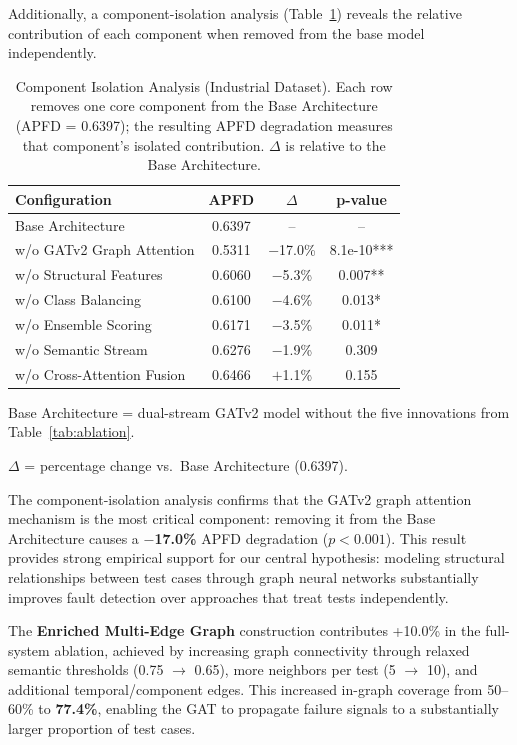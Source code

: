 Additionally, a component-isolation analysis (Table~\ref{tab:ablation_isolation})
reveals the relative contribution of each component when removed from the
base model independently.

\begin{table}[!t]
\centering
\caption{Component Isolation Analysis (Industrial Dataset). Each row removes one core component from the Base Architecture (APFD = 0.6397); the resulting APFD degradation measures that component's isolated contribution. $\Delta$ is relative to the Base Architecture.}
\label{tab:ablation_isolation}
\footnotesize
\begin{tabular}{lccc}
\toprule
\textbf{Configuration} & \textbf{APFD} & \textbf{$\Delta$} & \textbf{p-value} \\
\midrule
Base Architecture & 0.6397 & -- & -- \\
w/o GATv2 Graph Attention & 0.5311 & $-$17.0\% & 8.1e-10*** \\
w/o Structural Features & 0.6060 & $-$5.3\% & 0.007** \\
w/o Class Balancing & 0.6100 & $-$4.6\% & 0.013* \\
w/o Ensemble Scoring & 0.6171 & $-$3.5\% & 0.011* \\
w/o Semantic Stream & 0.6276 & $-$1.9\% & 0.309 \\
w/o Cross-Attention Fusion & 0.6466 & $+$1.1\% & 0.155 \\
\bottomrule
\end{tabular}
\begin{tablenotes}
\small
\item Base Architecture = dual-stream GATv2 model without the five innovations from Table~\ref{tab:ablation}.
\item $\Delta$ = percentage change vs.\ Base Architecture (0.6397).
\end{tablenotes}
\end{table}

The component-isolation analysis confirms that the GATv2 graph
attention mechanism is the most critical component: removing it from the
Base Architecture causes a \textbf{$-$17.0\%} APFD degradation
($p < 0.001$). This result provides strong empirical support for
our central hypothesis: modeling structural relationships between test cases
through graph neural networks substantially improves fault detection over
approaches that treat tests independently.

The \textbf{Enriched Multi-Edge Graph} construction contributes +10.0\% in the
full-system ablation, achieved by increasing graph connectivity through relaxed
semantic thresholds (0.75 $\rightarrow$ 0.65), more neighbors per test
(5 $\rightarrow$ 10), and additional temporal/component edges. This increased
in-graph coverage from 50--60\% to \textbf{77.4\%}, enabling the GAT to
propagate failure signals to a substantially larger proportion of test cases.

